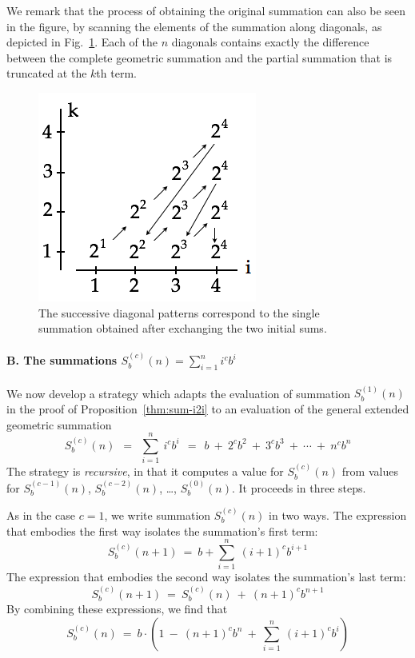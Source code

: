 We remark that the process of obtaining the original summation can also be seen in the figure, by scanning the elements of the summation along diagonals, as depicted in Fig.~\ref{fig:Sumi2iDiag}.  Each of the $n$ diagonals contains exactly the difference between the
complete geometric summation and the partial summation that is truncated at the $k$th term.
\begin{figure}[htb]
\centerline{
\includegraphics[scale=0.35]{FiguresMaths/Sumi2iDiag}
}
\caption{The successive diagonal patterns correspond to the single summation obtained after exchanging the two initial sums.}
\label{fig:Sumi2iDiag}
\end{figure}


\paragraph{B. The summations $S^{(c)}_b(n) =  \sum_{i=1}^n i^c b^i$}

We now develop a strategy which adapts the evaluation of summation $S_b^{(1)}(n)$ in the proof of Proposition~\ref{thm:sum-i2i} to an evaluation of the general extended geometric summation
\[
S_b^{(c)}(n) \ \ = \ \ \sum_{i=1}^n \ i^c b^i
 \ \ = \ \
b \ + \ 2^{c} b^2\ + \ 3^{c} b^3 \ + \ \cdots \ + \ n^{c} b^{n}
\]
The strategy is {\em recursive}, in that it computes a value for $S^{(c)}_b(n)$ from values for $S^{(c-1)}_b(n)$, $S^{(c-2)}_b(n)$, \ldots, $S^{(0)}_b(n)$.  It proceeds in three steps.

\smallskip

As in the case $c=1$, we write summation $S_b^{(c)}(n)$ in two ways.  The expression that embodies the first way isolates the summation's first term:
\[ S_b^{(c)}(n+1) \ = \ b + \sum_{i=1}^n \ (i+1)^c b^{i+1} \]
The expression that embodies the second way isolates the summation's last term:
\[ S_b^{(c)}(n+1) \ = \ S_b^{(c)}(n) \ + \ (n+1)^{c} b^{n+1} \]
By combining these expressions, we find that
\begin{equation}
\label{eq:Sbcn-1}
S_b^{(c)}(n) 
 \ = \
b \cdot \left(
1 \ - \
(n+1)^{c} b^{n} \ + \
 \sum_{i=1}^n \ (i+1)^c b^{i} 
\right)
\end{equation}

